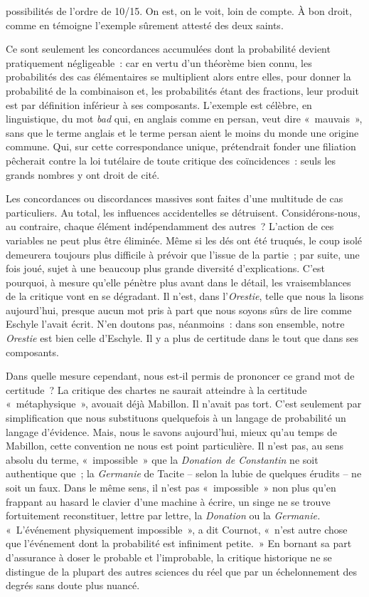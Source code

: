 \documentclass[french,twoside]{book} %
\begin{document}
\label{p64} possibilités de l’ordre de 10/15. On est, on le voit, loin de compte. À bon droit, comme en témoigne l’exemple sûrement attesté des deux saints.\par
Ce sont seulement les concordances accumulées dont la probabilité devient pratiquement négligeable : car en vertu d’un théorème bien connu, les probabilités des cas élémentaires se multiplient alors entre elles, pour donner la probabilité de la combinaison et, les probabilités étant des fractions, leur produit est par définition inférieur à ses compo­sants. L’exemple est célèbre, en linguistique, du mot \emph{bad} qui, en anglais comme en persan, veut dire « mauvais », sans que le terme anglais et le terme persan aient le moins du monde une origine commune. Qui, sur cette correspondance unique, prétendrait fonder une filiation pêcherait contre la loi tutélaire de toute critique des coïncidences : seuls les grands nombres y ont droit de cité.\par
Les concordances ou discordances massives sont faites d’une multitude de cas particuliers. Au total, les influences accidentelles se détruisent. Considérons‑nous, au contraire, chaque élément indépendamment des autres ? L’action de ces variables ne peut plus être éliminée. Même si les dés ont été truqués, le coup isolé demeurera toujours plus difficile à prévoir que l’issue de la partie ; par suite, une fois joué, sujet à une beaucoup plus grande diversité d’explications. C’est pourquoi, à mesure qu’elle pénètre plus avant dans le détail, les vraisemblances de la critique vont en se dégradant. Il n’est, dans l’\emph{Orestie}, telle que nous la lisons aujourd’hui, presque aucun mot pris à part que nous soyons sûrs de lire comme Eschyle l’avait écrit. N’en doutons pas, néanmoins : dans son ensemble, notre \emph{Orestie} est bien celle d’Eschyle. Il y a plus de certitude dans le tout que dans ses composants.\par
Dans quelle mesure cependant, nous est‑il permis de prononcer ce grand mot de certitude ? La critique des chartes ne saurait atteindre à la cer­titude « métaphysique », avouait déjà Mabillon. Il n’avait pas tort. C’est seulement par simplification que nous substituons quelquefois à un langage de probabilité un langage d’évidence. Mais, nous le savons aujourd’hui, mieux qu’au temps de Mabillon, cette convention ne nous est point par­ticulière. Il n’est pas, au sens absolu du terme, « impossible » que la  
\label{p65} \emph{Donation de Constantin} ne soit authentique que ; la \emph{Germanie} de Tacite – selon la lubie de quelques érudits – ne soit un faux. Dans le même sens, il n’est pas « impossible » non plus qu’en frappant au hasard le clavier d’une machine à écrire, un singe ne se trouve fortuitement reconstituer, lettre par lettre, la \emph{Donation} ou la \emph{Germanie.} « L’événement physiquement impossible », a dit Cournot, « n’est autre chose que l’événement dont la probabilité est infiniment petite. » En bornant sa part d’assurance à doser le probable et l’improbable, la critique historique ne se distingue de la plupart des autres sciences du réel que par un échelonnement des degrés sans doute plus nuancé.\par
\end{document}
